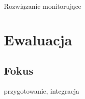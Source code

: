 \begin{chapter}{Rozwiązanie monitorujące}
	\newcommand{\chapterPath}{chapters/Heat_map_tool}

	
	
	
	
	
	
	\section{Ewaluacja}
	\subsection{Fokus}
	przygotowanie, integracja
	
	

\end{chapter}
